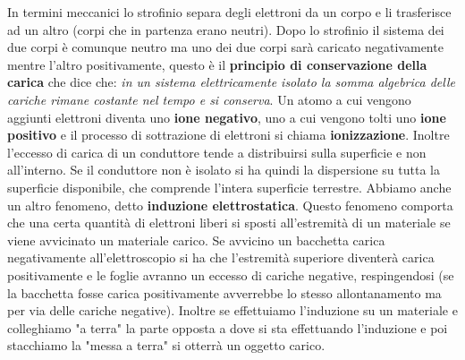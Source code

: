 \documentclass[a4paper,12pt, oneside]{book}
\begin{document}
In termini meccanici lo strofinio separa degli elettroni da un corpo e li trasferisce ad un altro (corpi che in partenza erano neutri). Dopo lo strofinio il sistema dei due corpi è comunque neutro ma uno dei due corpi sarà caricato negativamente mentre l'altro positivamente, questo è il \textbf{principio di conservazione della carica} che dice che: \textit{in un sistema elettricamente isolato la somma algebrica delle cariche rimane costante nel tempo e si conserva}. Un atomo a cui vengono aggiunti elettroni diventa uno \textbf{ione negativo}, uno a cui vengono tolti uno \textbf{ione positivo} e il processo di sottrazione di elettroni si chiama \textbf{ionizzazione}. Inoltre l'eccesso di carica di un conduttore tende a distribuirsi sulla superficie e non all'interno. Se il conduttore non è isolato si ha quindi la dispersione su tutta la superficie disponibile, che comprende l'intera superficie terrestre. Abbiamo anche un altro fenomeno, detto \textbf{induzione elettrostatica}. Questo fenomeno comporta che una certa quantità di elettroni liberi si sposti all'estremità di un materiale se viene avvicinato un materiale carico. Se avvicino un bacchetta carica negativamente all'elettroscopio si ha che l'estremità superiore diventerà carica positivamente e le foglie avranno un eccesso di cariche negative, respingendosi (se la bacchetta fosse carica positivamente avverrebbe lo stesso allontanamento ma per via delle cariche negative). Inoltre se effettuiamo l'induzione su un materiale e colleghiamo "a terra" la parte opposta a dove si sta effettuando l'induzione e poi stacchiamo la "messa a terra" si otterrà un oggetto carico. 
\end{document}
